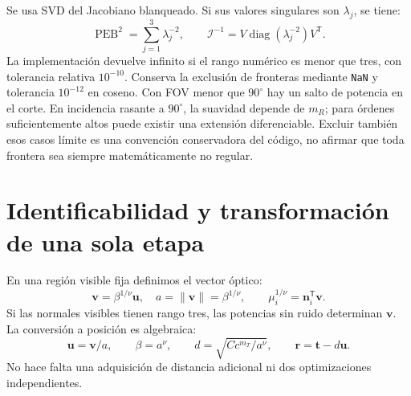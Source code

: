 \documentclass[11pt,a4paper]{article}
\newcommand{\PEB}{\operatorname{PEB}}
\begin{document}
Se usa SVD del Jacobiano blanqueado. Si sus valores singulares son $\lambda_j$, se tiene:
\begin{equation}
 \PEB^2=\sum_{j=1}^3\lambda_j^{-2},\qquad
 \mathcal I^{-1}=V\operatorname{diag}(\lambda_j^{-2})V^{\mathsf T}.
\end{equation}
La implementación devuelve infinito si el rango numérico es menor que tres, con tolerancia relativa $10^{-10}$. Conserva la exclusión de fronteras mediante \texttt{NaN} y tolerancia $10^{-12}$ en coseno. Con FOV menor que $90^\circ$ hay un salto de potencia en el corte. En incidencia rasante a $90^\circ$, la suavidad depende de $m_R$; para órdenes suficientemente altos puede existir una extensión diferenciable. Excluir también esos casos límite es una convención conservadora del código, no afirmar que toda frontera sea siempre matemáticamente no regular.

\section{Identificabilidad y transformación de una sola etapa}
En una región visible fija definimos el vector óptico:
\begin{equation}
 \mathbf v=\beta^{1/\nu}\mathbf u,\quad a=\|\mathbf v\|=\beta^{1/\nu},\qquad
 \mu_i^{1/\nu}=\mathbf n_i^{\mathsf T}\mathbf v.
\label{eq:rootlinear}
\end{equation}
Si las normales visibles tienen rango tres, las potencias sin ruido determinan $\mathbf v$. La conversión a posición es algebraica:
\begin{equation}
 \mathbf u=\mathbf v/a,\qquad \beta=a^\nu,\qquad
 d=\sqrt{Cc^{m_T}/a^\nu},\qquad \mathbf r=\mathbf t-d\mathbf u.
\label{eq:inverse}
\end{equation}
No hace falta una adquisición de distancia adicional ni dos optimizaciones independientes.
\end{document}
